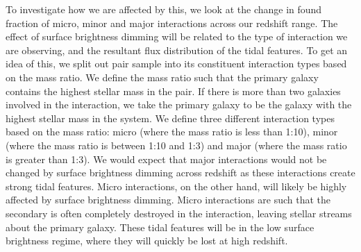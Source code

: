 To investigate how we are affected by this, we look at the change in found fraction of micro, minor and major interactions across our redshift range. The effect of surface brightness dimming will be related to the type of interaction we are observing, and the resultant flux distribution of the tidal features. To get an idea of this, we split out pair sample into its constituent interaction types based on the mass ratio. We define the mass ratio such that the primary galaxy contains the highest stellar mass in the pair. If there is more than two galaxies involved in the interaction, we take the primary galaxy to be the galaxy with the highest stellar mass in the system. We define three different interaction types based on the mass ratio: micro (where the mass ratio is less than 1:10), minor (where the mass ratio is between 1:10 and 1:3) and major (where the mass ratio is greater than 1:3). We would expect that major interactions would not be changed by surface brightness dimming across redshift as these interactions create strong tidal features. Micro interactions, on the other hand, will likely be highly affected by surface brightness dimming. Micro interactions are such that the secondary is often completely destroyed in the interaction, leaving stellar streams about the primary galaxy. These tidal features will be in the low surface brightness regime, where they will quickly be lost at high redshift.

